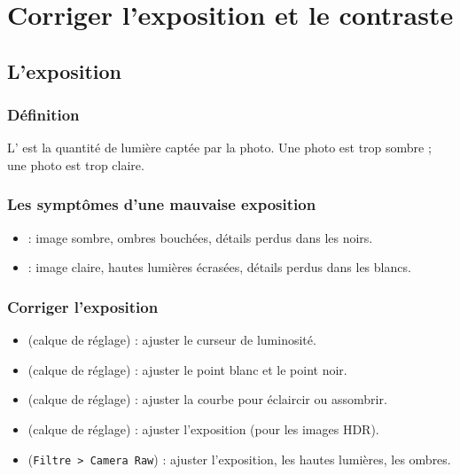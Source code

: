 \section{Corriger l'exposition et le contraste}

\subsection{L'exposition}

\subsubsection{Définition}

L' est la quantité de lumière captée par la photo. Une photo  est trop sombre ; une photo  est trop claire.

\subsubsection{Les symptômes d'une mauvaise exposition}

\begin{itemize}
    \item {} : image sombre, ombres bouchées, détails perdus dans les noirs.
    \item {} : image claire, hautes lumières écrasées, détails perdus dans les blancs.
\end{itemize}

\subsubsection{Corriger l'exposition}

\begin{itemize}
    \item {} (calque de réglage) : ajuster le curseur de luminosité.
    \item {} (calque de réglage) : ajuster le point blanc et le point noir.
    \item {} (calque de réglage) : ajuster la courbe pour éclaircir ou assombrir.
    \item {} (calque de réglage) : ajuster l'exposition (pour les images HDR).
    \item {} (\texttt{Filtre > Camera Raw}) : ajuster l'exposition, les hautes lumières, les ombres.
\end{itemize}

